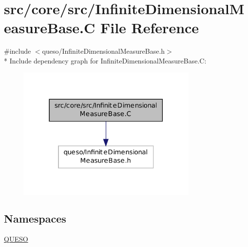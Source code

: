 \hypertarget{_infinite_dimensional_measure_base_8_c}{\section{src/core/src/\-Infinite\-Dimensional\-Measure\-Base.C File Reference}
\label{_infinite_dimensional_measure_base_8_c}
}
{\ttfamily \#include $<$queso/\-Infinite\-Dimensional\-Measure\-Base.\-h$>$}\\*
Include dependency graph for Infinite\-Dimensional\-Measure\-Base.\-C\-:
\nopagebreak
\begin{figure}[H]
\begin{center}
\leavevmode
\includegraphics[width=254pt]{_infinite_dimensional_measure_base_8_c__incl}
\end{center}
\end{figure}
\subsection*{Namespaces}
\begin{DoxyCompactItemize}
\item 
\hyperlink{namespace_q_u_e_s_o}{Q\-U\-E\-S\-O}
\end{DoxyCompactItemize}
